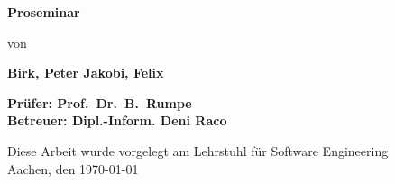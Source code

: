 \begin{titlepage}
\begin{flushleft}
{    {\Large \textbf{Proseminar}\\}
        \vspace{3em}

        {\large von\\} %

    {\LARGE \textbf{Birk, Peter     Jakobi, Felix}\\}
    \vspace{3em}

    {\Large \textbf{Prüfer: Prof.\ Dr.\ B.\ Rumpe}\\}
    \vspace{1em}
    {\Large \textbf{Betreuer: Dipl.-Inform. Deni Raco}\\}
    \vspace{7em}

    {\large Diese Arbeit wurde vorgelegt am Lehrstuhl für Software Engineering \\}
    \vspace{1em}
        {\large Aachen, den \today\\}
  }
\end{flushleft}

\end{titlepage}






